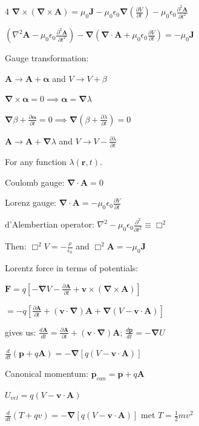 \documentclass[a4paper,twoside]{article}
\begin{document}
\begin{multicols*}{4}
\(\bm \nabla \times (\bm \nabla \times \bm A)= \mu_0 \bm J - \mu_0 \epsilon_0 \bm \nabla \left(\frac{\partial V }{\partial t}\right) - \mu_0 \epsilon_0 \frac{\partial^2 \bm A}{\partial t^2}\)

\( ( \nabla^2 \bm A - \mu_0 \epsilon_0 \frac{\partial^2 \bm A}{\partial t^2} ) 
- \bm \nabla (\bm \nabla \cdot \bm A + \mu_0 \epsilon_0 \frac{\partial V}{\partial t} )
= -\mu_0 \bm J\)

Gauge transformation:

\(\bm A \to \bm A + \bm \alpha\) and \(V \to V + \beta\) 

\(\bm \nabla \times \bm\alpha = 0 \implies \bm \alpha = \bm \nabla \lambda\)

\(\bm \nabla \beta + \frac{\partial \bm \alpha}{\partial t} = 0 \implies\bm \nabla (\beta + \frac{\partial \lambda}{\partial t})=0\)

\(\bm A \to \bm A + \bm \nabla \lambda\) and \(V \to V - \frac{\partial \lambda}{\partial t}\)

For any function \(\lambda(\bm r, t)\).

Coulomb gauge: \(\bm \nabla \cdot \bm A = 0\)

Lorenz gauge: \(\bm \nabla \cdot \bm A = -\mu_0 \epsilon_0 \frac{\partial V}{\partial t} \)

d'Alembertian operator:  \(\nabla^2 -\mu_0 \epsilon_0 \frac{\partial^2}{\partial t^2} \equiv \Box^2\)

Then:
\(\Box^2 V = -\frac{\rho}{\epsilon_0}\) and \(\Box^2 \bm A = -\mu_0 \bm J\)

Lorentz force in terms of potentials:

\(\bm F = q [ -\bm \nabla V - \frac{\partial \bm A}{\partial t} + \bm v \times (\bm \nabla \times \bm A)] \)

\(= -q[\frac{\partial \bm A}{\partial t} + (\bm v \cdot \bm \nabla) \bm A + \bm \nabla (V-\bm v \cdot \bm A)]\)

gives us:
\( \frac{d \bm A}{dt} = \frac{\partial \bm A}{\partial t} + (\bm v \cdot \bm \nabla) \bm A \);
\(\frac{d\bm p}{dt} = - \bm \nabla U\)

\(\frac{d}{dt}(\bm p + q \bm A) = - \bm \nabla [q(V-\bm v \cdot \bm A)]\)

Canonical momentum:
\(\bm p_{can} = \bm p + q \bm A\)

\(U_{vel} = q(V-\bm v \cdot \bm A)\)

\(\frac{d}{dt} (T + qv) = - \bm \nabla [q(V-\bm v \cdot \bm A)]\) met \(T = \frac{1}{2}mv^2\)


\end{multicols*}
\end{document}
